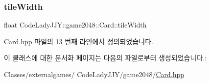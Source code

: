 \subsubsection{\texorpdfstring{tile\+Width}{tileWidth}}
{\footnotesize\ttfamily float Code\+Lady\+J\+J\+Y\+::game2048\+::\+Card\+::tile\+Width\hspace{0.3cm}{\ttfamily [private]}}



Card.\+hpp 파일의 13 번째 라인에서 정의되었습니다.



이 클래스에 대한 문서화 페이지는 다음의 파일로부터 생성되었습니다.\+:\begin{DoxyCompactItemize}
\item 
Classes/externalgames/ Code\+Lady\+J\+J\+Y/game2048/\hyperlink{_card_8hpp}{Card.\+hpp}\end{DoxyCompactItemize}
